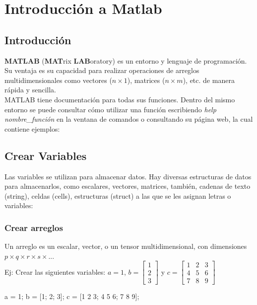 \chapter{Introducción a Matlab}

\section{Introducción}

\textbf{MATLAB} (\textbf{MAT}rix \textbf{LAB}oratory) es un entorno y lenguaje de programación. Su ventaja es su capacidad para realizar operaciones de arreglos multidimensionales como vectores ($n \times 1$), matrices ($n \times m$), etc. de manera rápida y sencilla. \\

\noindent MATLAB tiene documentación para todas sus funciones. Dentro del mismo entorno se puede consultar cómo utilizar una función escribiendo \emph{help nombre\_función} en la ventana de comandos o consultando su página web, la cual contiene ejemplos:

\section{Crear Variables}
Las variables se utilizan para almacenar datos. Hay diversas estructuras de datos para almacenarlos, como escalares, vectores, matrices, también, cadenas de texto (string), celdas (cells), estructuras (struct) a las que se les asignan letras o variables:

\subsection{Crear arreglos}
Un arreglo es un escalar, vector, o un tensor multidimensional, con dimensiones $p \times q \times r \times s \times ...$ \\

Ej: Crear las siguientes variables: $a = 1$, $b = \begin{bmatrix}
1 \\
2 \\
3
\end{bmatrix}
$ y $c = \begin{bmatrix}
1 & 2 & 3 \\
4 & 5 & 6 \\
7 & 8 & 9
\end{bmatrix}
$

\begin{verbatimg}
    a = 1;                          %
    b = [1; 2; 3];                  %
    c = [1 2 3; 4 5 6; 7 8 9];      %
\end{verbatimg}

